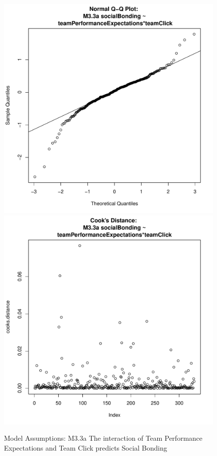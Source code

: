 \documentclass[12pt]{report}
\begin{document}
{\begin{figure}[htbp]
  \includegraphics[scale =.4]{../images/MLM33aQQNorm.pdf}
  \includegraphics[scale =.4]{../images/MLM33aCooksD.pdf}
  \caption{Model Assumptions: M3.3a The interaction of Team Performance Expectations and Team Click predicts Social Bonding}
  \label{fig:MLM33aAssumptions}
\end{figure}

}
\end{document}
